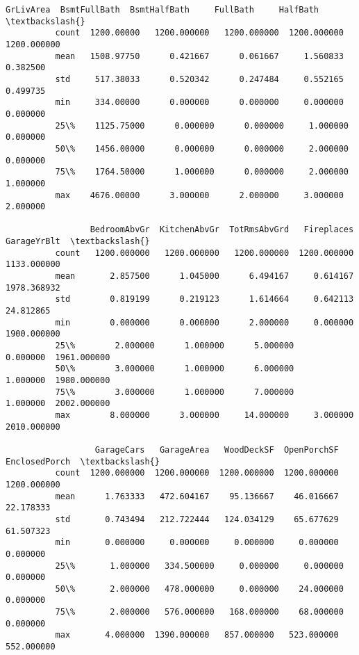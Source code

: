 \documentclass[11pt]{article}
\begin{document}
\begin{Verbatim}[commandchars=\\\{\}]
                  GrLivArea  BsmtFullBath  BsmtHalfBath     FullBath     HalfBath  \textbackslash{}
          count  1200.00000   1200.000000   1200.000000  1200.000000  1200.000000   
          mean   1508.97750      0.421667      0.061667     1.560833     0.382500   
          std     517.38033      0.520342      0.247484     0.552165     0.499735   
          min     334.00000      0.000000      0.000000     0.000000     0.000000   
          25\%    1125.75000      0.000000      0.000000     1.000000     0.000000   
          50\%    1456.00000      0.000000      0.000000     2.000000     0.000000   
          75\%    1764.50000      1.000000      0.000000     2.000000     1.000000   
          max    4676.00000      3.000000      2.000000     3.000000     2.000000   
          
                 BedroomAbvGr  KitchenAbvGr  TotRmsAbvGrd   Fireplaces  GarageYrBlt  \textbackslash{}
          count   1200.000000   1200.000000   1200.000000  1200.000000  1133.000000   
          mean       2.857500      1.045000      6.494167     0.614167  1978.368932   
          std        0.819199      0.219123      1.614664     0.642113    24.812865   
          min        0.000000      0.000000      2.000000     0.000000  1900.000000   
          25\%        2.000000      1.000000      5.000000     0.000000  1961.000000   
          50\%        3.000000      1.000000      6.000000     1.000000  1980.000000   
          75\%        3.000000      1.000000      7.000000     1.000000  2002.000000   
          max        8.000000      3.000000     14.000000     3.000000  2010.000000   
          
                  GarageCars   GarageArea   WoodDeckSF  OpenPorchSF  EnclosedPorch  \textbackslash{}
          count  1200.000000  1200.000000  1200.000000  1200.000000    1200.000000   
          mean      1.763333   472.604167    95.136667    46.016667      22.178333   
          std       0.743494   212.722444   124.034129    65.677629      61.507323   
          min       0.000000     0.000000     0.000000     0.000000       0.000000   
          25\%       1.000000   334.500000     0.000000     0.000000       0.000000   
          50\%       2.000000   478.000000     0.000000    24.000000       0.000000   
          75\%       2.000000   576.000000   168.000000    68.000000       0.000000   
          max       4.000000  1390.000000   857.000000   523.000000     552.000000   
          

\end{Verbatim}
\end{document}
